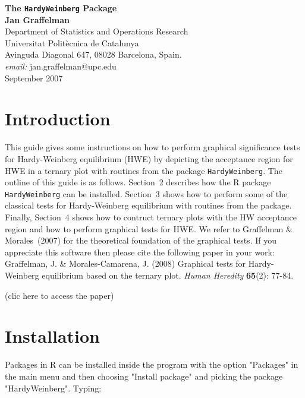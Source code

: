 \documentclass[a4paper]{article}
\begin{document}


\begin{center}
\sf
{\sf \bf \Large The {\tt HardyWeinberg} Package}\\
\vspace{4mm}
{\bf \large Jan Graffelman}\\
\vspace{4mm} \rm \large
Department of Statistics and Operations Research\\
Universitat Polit\`ecnica de Catalunya\\
Avinguda Diagonal 647, 08028 Barcelona, Spain.\\
{\it email:} jan.graffelman@upc.edu\\
\vspace{4mm}
{\sc September 2007}
\end{center}

\section{Introduction}

This guide gives some instructions on how to perform graphical significance tests for Hardy-Weinberg
equilibrium (HWE) by depicting the acceptance region for HWE in a ternary plot with routines from
the package {\tt HardyWeinberg}. The outline of this guide is as follows. Section~2 
describes how the R package {\tt HardyWeinberg} can be installed. Section~3 shows 
how to perform some of the classical tests for Hardy-Weinberg equilibrium with routines from the package. 
Finally, Section~4 shows how to contruct ternary plots with the HW acceptance region 
and how to perform graphical tests for HWE. We refer to Graffelman \& Morales~(2007) 
for the theoretical foundation of the graphical tests. If you appreciate this software then please 
cite the following paper in your work:\\

Graffelman, J. \& Morales-Camarena, J. (2008) Graphical tests for Hardy-Weinberg equilibrium
based on the ternary plot. {\it Human Heredity} {\bf 65}(2): 77-84. 
(clic here to access the paper)

\section{Installation}
\label{sec:install}

Packages in R can be installed inside the program with the option "Packages"
in the main menu and then choosing "Install package" and picking the package
"HardyWeinberg". Typing:
\end{document}
